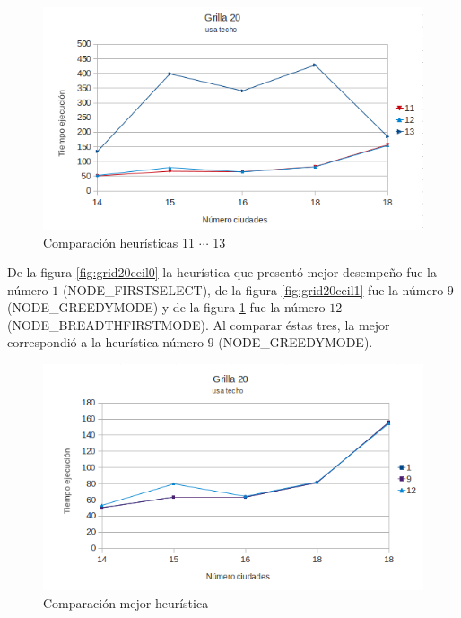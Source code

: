 \documentclass[10pt]{article}
\begin{document}
\begin{figure}[ht]
\begin{minipage}[b]{1\linewidth}
  \centering
 \includegraphics[scale=0.4]{grilla20ceil2.png}
 \caption{Comparación heurísticas  11 $\cdots$ 13}
 \label{fig:grid20ceil2}
\end{minipage}

\end{figure}


De la figura \ref{fig:grid20ceil0} la heurística que presentó mejor desempeño fue la número $1$ (NODE\_FIRSTSELECT), de la figura \ref{fig:grid20ceil1} fue la número $9$ (NODE\_GREEDYMODE) y de la 
figura \ref{fig:grid20ceil2} fue la número $12$ (NODE\_BREADTHFIRSTMODE). Al comparar éstas tres, la mejor correspondió a la heurística número $9$ (NODE\_GREEDYMODE).

\begin{figure}[ht]
\begin{minipage}[b]{1\linewidth}
 \centering
 \includegraphics[scale=0.4]{grilla20ceil3.png}
 \caption{Comparación mejor heurística}
 \label{fig:grid20ceil3}
\end{minipage}
\end{figure}
\end{document}

